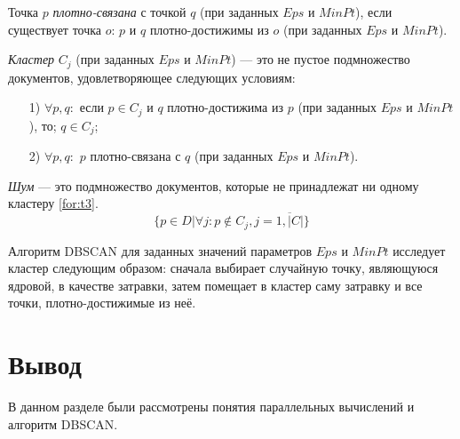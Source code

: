 Точка $p$ \textit{плотно-связана} с точкой $q$ (при заданных $Eps$ и $MinPt$), если существует точка $o$: $p$ и $q$ плотно-достижимы из $o$ (при заданных $Eps$ и $MinPt$).

\textit{Кластер} $C_j$ (при заданных $Eps$ и $MinPt$) --- это не пустое подмножество документов, удовлетворяющее следующих условиям:
\begin{enumerate}
	\item[1)] $\forall p, q:$ если $p \in C_j$ и $q$ плотно-достижима из $p$ (при заданных $Eps$ и $MinPt$), то; $q \in C_j$;
	\item[2)] $\forall p, q:$ $p$ плотно-связана с $q$ (при заданных $Eps$ и $MinPt$).
\end{enumerate}

\textit{Шум} --- это подмножество документов, которые не принадлежат ни одному кластеру \ref{for:t3}.
\begin{equation}
\label{for:t3}
	\{p \in D | \forall j: p \notin C_j, j = \overline{1, |C|}\}
\end{equation}

Алгоритм DBSCAN для заданных значений параметров $Eps$ и $MinPt$ исследует кластер следующим образом: сначала выбирает случайную точку, являющуюся ядровой, в качестве затравки, затем помещает в кластер саму затравку и все точки, плотно-достижимые из неё.

\section*{Вывод}

В данном разделе были рассмотрены понятия параллельных вычислений и алгоритм DBSCAN.
